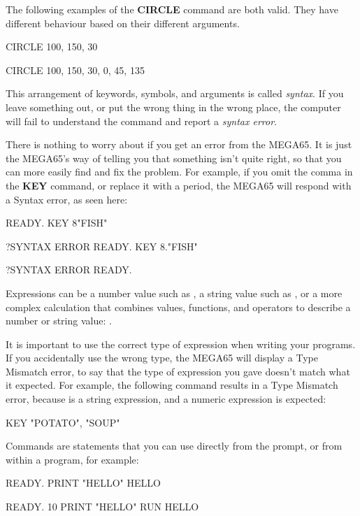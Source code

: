 The following examples of the {\bf CIRCLE} command are both valid. They have different behaviour based on their different arguments.

\begin{screencode}
CIRCLE 100, 150, 30

CIRCLE 100, 150, 30, 0, 45, 135
\end{screencode}

This arrangement of keywords, symbols, and arguments is called {\em syntax}. If you leave something out, or put the wrong thing in the wrong place, the computer will fail to understand the command and report a {\em syntax error}.

There is nothing to worry about if you get an error from the MEGA65. It is just the MEGA65's way of telling you that something isn't quite right, so that you can more easily find and fix the problem. For example, if you omit the comma in the {\bf KEY} command, or replace it with a period, the MEGA65 will respond with a Syntax error, as seen here:

\begin{screencode}
READY.
KEY 8"FISH"

?SYNTAX ERROR
READY.
KEY 8."FISH"

?SYNTAX ERROR
READY.
\end{screencode}

Expressions can be a number value such as , a string value such as , or a more complex calculation that combines values, functions, and operators to describe a number or string value: .

It is important to use the correct type of expression when writing your programs. If you accidentally use the wrong type, the MEGA65 will display a Type Mismatch error, to say that the type of expression you gave doesn't match what it expected. For example, the following command results in a Type Mismatch error, because  is a string expression, and a numeric expression is expected:

\begin{screencode}
KEY "POTATO", "SOUP"
\end{screencode}

Commands are statements that you can use directly from the  prompt, or from within a program, for example:

\begin{screencode}
READY.
PRINT "HELLO"
HELLO

READY.
10 PRINT "HELLO"
RUN
HELLO
\end{screencode}

